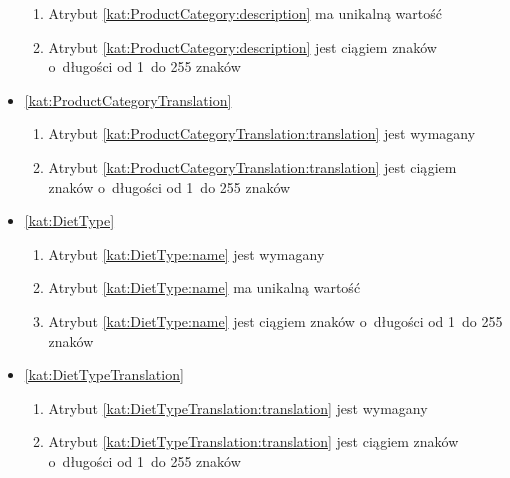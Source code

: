 \begin{itemize}[label={\textbf{Ograniczenia dla}}, wide, labelwidth=!, labelindent=0pt]
\begin{enumerate}[label={\textbf{OGR/1/\protect\twodigits{\arabic{enumi}}}}, wide, labelwidth=!, align=left, leftmargin=3cm, resume]
        \item Atrybut \ref{kat:ProductCategory:description} ma unikalną wartość

        \item Atrybut \ref{kat:ProductCategory:description} jest ciągiem znaków o~długości od 1~do 255 znaków
    \end{enumerate}

    \item\ref{kat:ProductCategoryTranslation}\mynobreakpar
    \begin{enumerate}[label={\textbf{OGR/1/\protect\twodigits{\arabic{enumi}}}}, wide, labelwidth=!, align=left, leftmargin=3cm, resume]
        \item Atrybut \ref{kat:ProductCategoryTranslation:translation} jest wymagany

        \item Atrybut \ref{kat:ProductCategoryTranslation:translation} jest ciągiem znaków o~długości od 1~do 255 znaków
    \end{enumerate}

    \item\ref{kat:DietType}\mynobreakpar
    \begin{enumerate}[label={\textbf{OGR/1/\protect\twodigits{\arabic{enumi}}}}, wide, labelwidth=!, align=left, leftmargin=3cm, resume]
        \item Atrybut \ref{kat:DietType:name} jest wymagany

        \item Atrybut \ref{kat:DietType:name} ma unikalną wartość

        \item Atrybut \ref{kat:DietType:name} jest ciągiem znaków o~długości od 1~do 255 znaków
    \end{enumerate}

    \item\ref{kat:DietTypeTranslation}\mynobreakpar
    \begin{enumerate}[label={\textbf{OGR/1/\protect\twodigits{\arabic{enumi}}}}, wide, labelwidth=!, align=left, leftmargin=3cm, resume]
        \item Atrybut \ref{kat:DietTypeTranslation:translation} jest wymagany

        \item Atrybut \ref{kat:DietTypeTranslation:translation} jest ciągiem znaków o~długości od 1~do 255 znaków
    \end{enumerate}
\end{itemize}

